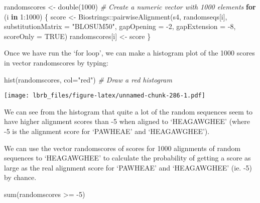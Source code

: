 \documentclass[
]{book}
\newenvironment{Shaded}{\begin{snugshade}}{\end{snugshade}}
\newcommand{\AttributeTok}[1]{\textcolor[rgb]{0.77,0.63,0.00}{#1}}
\newcommand{\CommentTok}[1]{\textcolor[rgb]{0.56,0.35,0.01}{\textit{#1}}}
\newcommand{\ConstantTok}[1]{\textcolor[rgb]{0.00,0.00,0.00}{#1}}
\newcommand{\ControlFlowTok}[1]{\textcolor[rgb]{0.13,0.29,0.53}{\textbf{#1}}}
\newcommand{\DecValTok}[1]{\textcolor[rgb]{0.00,0.00,0.81}{#1}}
\newcommand{\FunctionTok}[1]{\textcolor[rgb]{0.00,0.00,0.00}{#1}}
\newcommand{\NormalTok}[1]{#1}
\newcommand{\OtherTok}[1]{\textcolor[rgb]{0.56,0.35,0.01}{#1}}
\newcommand{\SpecialCharTok}[1]{\textcolor[rgb]{0.00,0.00,0.00}{#1}}
\newcommand{\StringTok}[1]{\textcolor[rgb]{0.31,0.60,0.02}{#1}}
\begin{document}
\begin{Shaded}
\begin{Highlighting}[]
\NormalTok{randomscores }\OtherTok{\textless{}{-}} \FunctionTok{double}\NormalTok{(}\DecValTok{1000}\NormalTok{) }\CommentTok{\# Create a numeric vector with 1000 elements}
\ControlFlowTok{for}\NormalTok{ (i }\ControlFlowTok{in} \DecValTok{1}\SpecialCharTok{:}\DecValTok{1000}\NormalTok{)}
\NormalTok{\{}
\NormalTok{  score }\OtherTok{\textless{}{-}}\NormalTok{ Biostrings}\SpecialCharTok{::}\FunctionTok{pairwiseAlignment}\NormalTok{(s4, randomseqs[i], }\AttributeTok{substitutionMatrix =} \StringTok{"BLOSUM50"}\NormalTok{,}
                             \AttributeTok{gapOpening =} \SpecialCharTok{{-}}\DecValTok{2}\NormalTok{, }\AttributeTok{gapExtension =} \SpecialCharTok{{-}}\DecValTok{8}\NormalTok{, }\AttributeTok{scoreOnly =} \ConstantTok{TRUE}\NormalTok{)}
\NormalTok{  randomscores[i] }\OtherTok{\textless{}{-}}\NormalTok{ score}
\NormalTok{\}}
\end{Highlighting}
\end{Shaded}

Once we have run the `for loop', we can make a histogram plot of the 1000 scores in vector randomscores by typing:

\begin{Shaded}
\begin{Highlighting}[]
\FunctionTok{hist}\NormalTok{(randomscores, }\AttributeTok{col=}\StringTok{"red"}\NormalTok{) }\CommentTok{\# Draw a red histogram}
\end{Highlighting}
\end{Shaded}

\texttt{[image: lbrb\_files/figure-latex/unnamed-chunk-286-1.pdf]}

We can see from the histogram that quite a lot of the random sequences seem to have higher alignment scores than -5 when aligned to `HEAGAWGHEE' (where -5 is the alignment score for `PAWHEAE' and `HEAGAWGHEE').

We can use the vector randomscores of scores for 1000 alignments of random sequences to `HEAGAWGHEE' to calculate the probability of getting a score as large as the real alignment score for `PAWHEAE' and `HEAGAWGHEE' (ie. -5) by chance.

\begin{Shaded}
\begin{Highlighting}[]
\FunctionTok{sum}\NormalTok{(randomscores }\SpecialCharTok{\textgreater{}=} \SpecialCharTok{{-}}\DecValTok{5}\NormalTok{)}
\end{Highlighting}
\end{Shaded}
\end{document}
